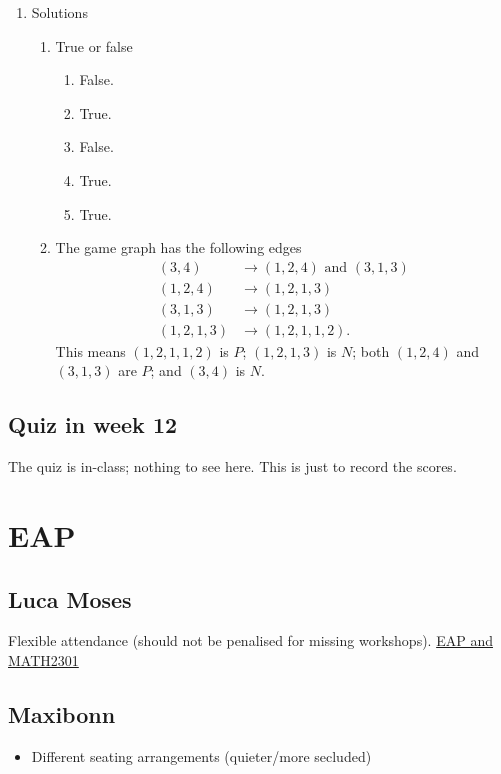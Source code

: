 \documentclass{amsart}
\begin{document}
\newpage
\begin{enumerate}
\item Solutions
\label{sec:org1173a23}
\begin{enumerate}
\item True or false
\begin{enumerate}
\item False.
\item True.
\item False.
\item True.
\item True.
\end{enumerate}

\item The game graph has the following edges
\begin{align*}
  (3,4) &\to (1,2,4) \text{ and } (3,1,3)\\
  (1,2,4) &\to (1,2,1,3)\\
  (3,1,3) &\to (1,2,1,3)\\
  (1,2,1,3) &\to (1,2,1,1,2).
\end{align*}
This means \((1,2,1,1,2)\) is \(P\); \((1,2,1,3)\) is \(N\); both \((1,2,4)\) and \((3,1,3)\) are \(P\); and \((3,4)\) is \(N\).
\end{enumerate}
\end{enumerate}
\subsection{Quiz in week 12}
\label{sec:org7356a37}
The quiz is in-class; nothing to see here.  This is just to record the scores.
\section{EAP}
\label{sec:orgea336a4}

\subsection{Luca Moses}
\label{sec:org1493f25}
Flexible attendance (should not be penalised for missing workshops).
\href{mu4e:msgid:ME3P282MB219424DF74C3D4E63B1D5AD7A32EA@ME3P282MB2194.AUSP282.PROD.OUTLOOK.COM}{EAP and MATH2301}
\subsection{Maxibonn}
\label{sec:org65c7162}
\begin{itemize}
\item Different seating arrangements (quieter/more secluded)
\end{itemize}
\end{document}

